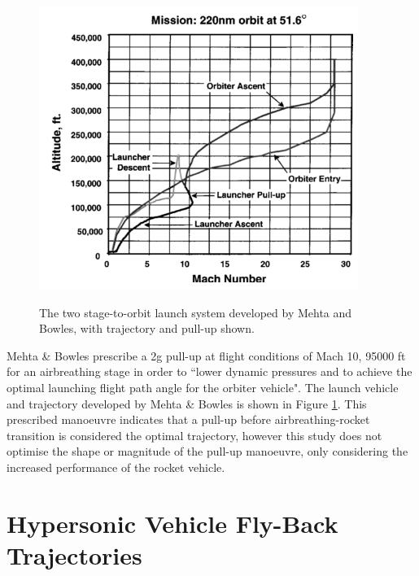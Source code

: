 \begin{figure}
\begin{minipage}[b]{0.3\textwidth}
		\label{fig:MehtaVehicle}
	\end{minipage}	
	\begin{minipage}[b]{0.6\textwidth}
		\includegraphics[width=\linewidth]{"figures/2_literature-review/Mehta Trajectory"}
	
		\label{fig:MehtaTrajectory}
	\end{minipage}
	\caption{The two stage-to-orbit launch system developed by Mehta and Bowles\cite{Mehta2001}, with trajectory and pull-up shown.}
	\label{fig:Mehta}
\end{figure}
Mehta \& Bowles\cite{Mehta2001} prescribe a 2g pull-up at flight conditions of Mach 10, 95000 ft for an airbreathing stage in order to ``lower dynamic pressures and to achieve the optimal launching flight path angle for the orbiter vehicle". The launch vehicle and trajectory developed by Mehta \& Bowles is shown in Figure \ref{fig:Mehta}. This prescribed manoeuvre indicates that a pull-up before airbreathing-rocket transition is considered the optimal trajectory, however this study does not optimise the shape or magnitude of the pull-up manoeuvre, only considering the increased performance of the rocket vehicle. 



\section{Hypersonic Vehicle Fly-Back Trajectories}

